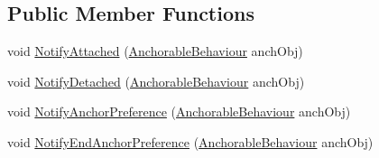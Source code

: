 \subsection*{Public Member Functions}
\begin{DoxyCompactItemize}
\item 
void \mbox{\hyperlink{class_leap_1_1_unity_1_1_interaction_1_1_anchor_a063da3d8209d998112e4268f024ececa}{Notify\+Attached}} (\mbox{\hyperlink{class_leap_1_1_unity_1_1_interaction_1_1_anchorable_behaviour}{Anchorable\+Behaviour}} anch\+Obj)
\item 
void \mbox{\hyperlink{class_leap_1_1_unity_1_1_interaction_1_1_anchor_af1262853ca7469aec0058bc30d1b9f31}{Notify\+Detached}} (\mbox{\hyperlink{class_leap_1_1_unity_1_1_interaction_1_1_anchorable_behaviour}{Anchorable\+Behaviour}} anch\+Obj)
\item 
void \mbox{\hyperlink{class_leap_1_1_unity_1_1_interaction_1_1_anchor_ac796b1e8a66df11300cf9766543fbe31}{Notify\+Anchor\+Preference}} (\mbox{\hyperlink{class_leap_1_1_unity_1_1_interaction_1_1_anchorable_behaviour}{Anchorable\+Behaviour}} anch\+Obj)
\item 
void \mbox{\hyperlink{class_leap_1_1_unity_1_1_interaction_1_1_anchor_af120f6521d455d9aa99f6e4bef45b692}{Notify\+End\+Anchor\+Preference}} (\mbox{\hyperlink{class_leap_1_1_unity_1_1_interaction_1_1_anchorable_behaviour}{Anchorable\+Behaviour}} anch\+Obj)
\end{DoxyCompactItemize}
